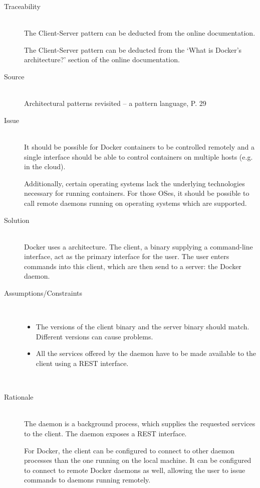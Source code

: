 \begin{description}
\item [Traceability]~\\
The Client-Server pattern can be deducted from the online documentation\cite{dockerarchi}.

The Client-Server pattern can be deducted from the `What is Docker’s architecture?' section of the online documentation\cite{dockerarchi}.

\item [Source]~\\
Architectural patterns revisited -- a pattern language, P. 29 \cite{avgeriou2005architectural}

\item [Issue]~\\
It should be possible for Docker containers to be controlled remotely and a single interface should be able to control containers on multiple hosts (e.g. in the cloud).

Additionally, certain operating systems lack the underlying technologies necessary for running containers. For those OSes, it should be possible to call remote daemons running on operating systems which are supported. %

\item [Solution]~\\
Docker uses a  architecture. The client, a binary supplying a command-line interface, act as the primary interface for the user. The user enters commands into this client, which are then send to a server: the Docker daemon. 


\item [Assumptions/Constraints]~
\begin{itemize}
\item The versions of the client binary and the server binary should match. Different versions can cause problems.
\item All the services offered by the daemon have to be made available to the client using a REST interface.
\end{itemize}
~\\[-1.7cm]
\item [Rationale] ~\\
The daemon is a background process, which supplies the requested services to the client. The daemon exposes a REST interface.

For Docker, the client can be configured to connect to other daemon processes than the one running on the local machine. It can be configured to connect to remote Docker daemons as well, allowing the user to issue commands to daemons running remotely.


\end{description}
